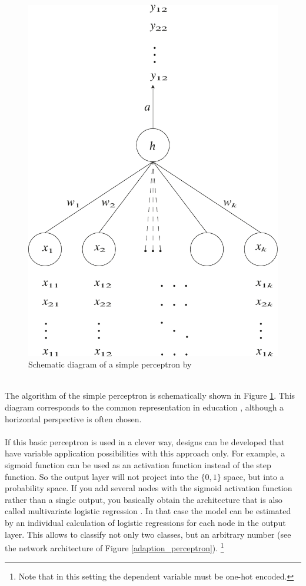 \documentclass[11pt,a4paper]{article}
\begin{document}
\begin{figure}[h]
	\centering
	\includegraphics[scale=0.4]{simple_perceptron.pdf}
	\caption{Schematic diagram of a simple perceptron by \cite{Rb1958}}
	\label{simple_perceptron}
\end{figure}
\ \\
The algorithm of the simple perceptron is schematically shown in Figure \ref{simple_perceptron}. This diagram corresponds to the common representation in education \cite{Mekherjee2019}, although a horizontal perspective is often chosen.\\
\\
If this basic perceptron is used in a clever way, designs can be developed that have variable application possibilities with this approach only. For example, a sigmoid function can be used as an activation function instead of the step function. So the output layer will not project into the $\{0,1\}$ space, but into a probability space. If you add several nodes with the sigmoid activation function rather than a single output, you basically obtain the architecture that is also called multivariate logistic regression \cite{Bahjat2006}. In that case the model can be estimated by an individual calculation of logistic regressions for each node in the output layer. This allows to classify not only two classes, but an arbitrary number (see the network architecture of Figure \ref{adaption_perceptron}). \footnote{Note that in this setting the dependent variable must be one-hot encoded.}\\
\end{document}
